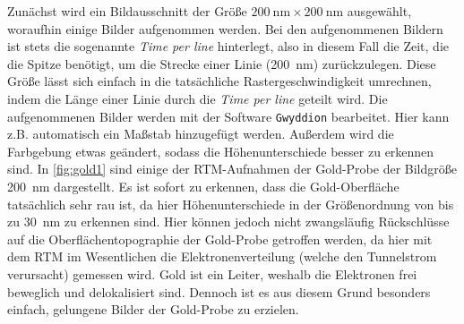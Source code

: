 Zunächst wird ein Bildausschnitt der Größe $\SI{200}{\nano \meter} \times \SI{200}{\nano \meter}$ ausgewählt, woraufhin einige Bilder aufgenommen werden.
Bei den aufgenommenen Bildern ist stets die sogenannte \textit{Time per line} hinterlegt, also in diesem Fall die Zeit, die die Spitze benötigt, um die Strecke
einer Linie (\SI{200}{\nano \meter}) zurückzulegen. Diese Größe lässt sich einfach in die tatsächliche Rastergeschwindigkeit umrechnen, indem die Länge einer Linie
durch die \textit{Time per line} geteilt wird. Die aufgenommenen Bilder werden mit der Software \texttt{Gwyddion} bearbeitet. Hier kann z.B. automatisch
ein Maßstab hinzugefügt werden. Außerdem wird die Farbgebung etwas geändert, sodass die Höhenunterschiede besser zu erkennen sind. In \cref{fig:gold1}
sind einige der RTM-Aufnahmen der Gold-Probe der Bildgröße \SI{200}{\nano \meter} dargestellt. Es ist sofort zu erkennen, dass die Gold-Oberfläche tatsächlich
sehr rau ist, da hier Höhenunterschiede in der Größenordnung von bis zu \SI{30}{\nano \meter} zu erkennen sind. Hier können jedoch nicht zwangsläufig Rückschlüsse
auf die Oberflächentopographie der Gold-Probe getroffen werden, da hier mit dem RTM im Wesentlichen die Elektronenverteilung (welche den Tunnelstrom verursacht) gemessen wird.
Gold ist ein Leiter, weshalb die Elektronen frei beweglich und delokalisiert sind. Dennoch ist es aus diesem Grund besonders einfach, gelungene Bilder
der Gold-Probe zu erzielen.
